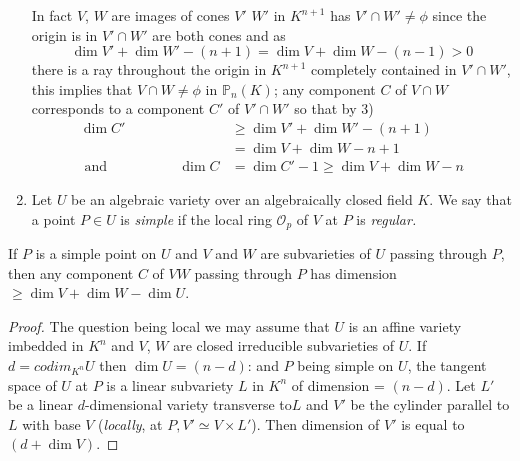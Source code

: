 \begin{enumerate}[1)]
   In fact $V$, $W$ are images of cones $V'$ $W'$ in $K^{n+1}$ has $V'
   \cap W' \neq \phi$ since the origin is in $V' \cap W'$ are both
   cones and as 
   $$
   \dim V' +\dim  W' -(n+1) = \dim V + \dim W -(n-1) > 0
   $$
   there is a ray throughout the origin in $K^{n+1}$ completely contained in 
   $V' \cap W'$, this implies that $V \cap W \neq \phi $ in
   $\mathbb{P}_n (K)$; any component $C$ of $V \cap W $ corresponds to
   a component $C'$ of $V' \cap W'$ so that by 3) 
   \begin{align*}
     \dim C' &\geq  \dim V' +\dim W' -(n+1)\\
     &= \dim V +\dim  W -n +1\\
     \text{ and }  \hspace{2cm}\dim C  & = \dim C' -1 \geq \dim  V +
     \dim W -n 
   \end{align*}  
 \item Let $U$ be an algebraic variety over an algebraically closed
   field $K$. We say that a point $P \in U$ is \textit{ simple } if the
   local ring $\mathscr{O}_p$ of $V$ at $P$ is \textit{ regular.} 
\end{enumerate}

\begin{prop*}%
  If $P$ is a simple point on $U$ and $V$ and $W$ are subvarieties of
  $U$ passing  through $P$, then any component $C$ of  $V  W$ passing
  through $P$ has dimension $\ge \dim  V + \dim W -\dim U$.   
\end{prop*}

\begin{proof}%
  The question being local we may assume that $U$ is an affine
  variety imbedded in $K^n$ and $V$, $W$ are closed irreducible
  subvarieties of $U$. If $d= codim_{K^{n}} U$ then $\dim U = (n-d)$:
  and $P$ being simple on $U$, the tangent space of $U$ at $P$ is a
  linear subvariety $L$ in $K^n$ of dimension = $(n-d)$. Let $L'$ be a
  linear $d$-dimensional variety transverse to\pageoriginale $L$ and $V'$ be the
  cylinder parallel to $L$ with base $V$ (\textit{locally}, at $P, V'
  \simeq V \times L'$). Then dimension of $V'$ is equal to $(d + \dim
  V)$.  
\end{proof}

